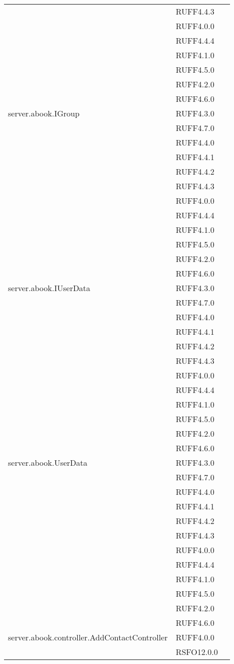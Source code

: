 \begin{center}
\begin{longtable}{lp{}l}
 & RUFF4.4.3 \\
 & RUFF4.0.0 \\
 & RUFF4.4.4 \\
 & RUFF4.1.0 \\
 & RUFF4.5.0 \\
 & RUFF4.2.0 \\
 & RUFF4.6.0 \\
server.abook.IGroup & RUFF4.3.0 \\
 & RUFF4.7.0 \\
 & RUFF4.4.0 \\
 & RUFF4.4.1 \\
 & RUFF4.4.2 \\
 & RUFF4.4.3 \\
 & RUFF4.0.0 \\
 & RUFF4.4.4 \\
 & RUFF4.1.0 \\
 & RUFF4.5.0 \\
 & RUFF4.2.0 \\
 & RUFF4.6.0 \\
server.abook.IUserData & RUFF4.3.0 \\
 & RUFF4.7.0 \\
 & RUFF4.4.0 \\
 & RUFF4.4.1 \\
 & RUFF4.4.2 \\
 & RUFF4.4.3 \\
 & RUFF4.0.0 \\
 & RUFF4.4.4 \\
 & RUFF4.1.0 \\
 & RUFF4.5.0 \\
 & RUFF4.2.0 \\
 & RUFF4.6.0 \\
server.abook.UserData & RUFF4.3.0 \\
 & RUFF4.7.0 \\
 & RUFF4.4.0 \\
 & RUFF4.4.1 \\
 & RUFF4.4.2 \\
 & RUFF4.4.3 \\
 & RUFF4.0.0 \\
 & RUFF4.4.4 \\
 & RUFF4.1.0 \\
 & RUFF4.5.0 \\
 & RUFF4.2.0 \\
 & RUFF4.6.0 \\
server.abook.controller.AddContactController & RUFF4.0.0 \\
 & RSFO12.0.0 \\

\end{longtable}
\end{center}
